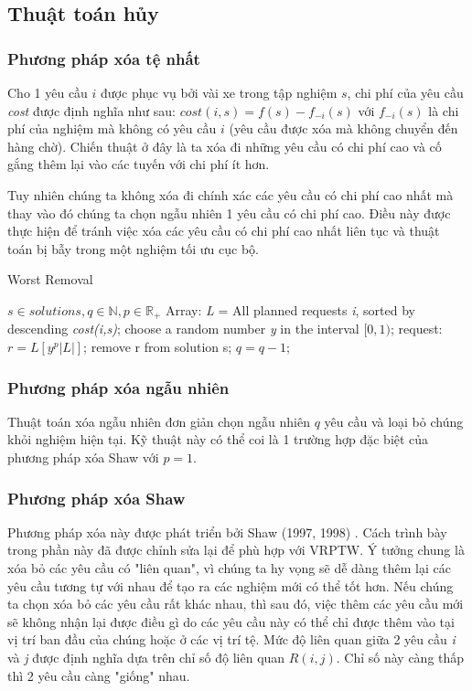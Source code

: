 \subsection{Thuật toán hủy}

\subsubsection*{Phương pháp xóa tệ nhất}
Cho 1 yêu cầu $i$ được phục vụ bởi vài xe trong tập nghiệm $s$, chi phí của yêu cầu \textit{cost} được định nghĩa như sau: $cost(i,s)=f(s)-f_{-i}(s)$ với $f_{-i}(s)$ là chi phí của nghiệm mà không có yêu cầu $i$ (yêu cầu được xóa mà không chuyển đến hàng chờ). Chiến thuật ở đây là ta xóa đi những yêu cầu có chi phí cao và cố gắng thêm lại vào các tuyến với chi phí ít hơn. 

Tuy nhiên chúng ta không xóa đi chính xác các yêu cầu có chi phí cao nhất mà thay vào đó chúng ta chọn ngẫu nhiên 1 yêu cầu có chi phí cao. Điều này được thực hiện để tránh việc xóa các yêu cầu có chi phí cao nhất liên tục và thuật toán bị bẫy trong một nghiệm tối ưu cục bộ.

\begin{algorithm}
  \label{alg:worst_removal}
    \caption{Worst Removal} 
	\begin{algorithmic}[1]
        \Require $s \in {solutions}, q \in \mathbb{N}, p \in \mathbb{R}_{+}$
		  \State Array: \textit{L} = All planned requests \textit{i}, sorted by descending \textit{cost(i,s)};
            \State choose a random number \textit{y} in the interval $[0, 1)$;
            \State request: $r = L\left[ y^p |L| \right]$;
            \State remove r from solution s;
            \State $q = q-1$;
        \EndWhile
	\end{algorithmic} 
\end{algorithm}

\subsubsection*{Phương pháp xóa ngẫu nhiên}
Thuật toán xóa ngẫu nhiên đơn giản chọn ngẫu nhiên $q$ yêu cầu và loại bỏ chúng khỏi nghiệm hiện tại. Kỹ thuật này có thể coi là 1 trường hợp đặc biệt của phương pháp xóa Shaw với $p=1$. 

\subsubsection*{Phương pháp xóa Shaw}
Phương pháp xóa này được phát triển bởi Shaw (1997, 1998) \cite{}. Cách trình bày trong phần này đã được chỉnh sửa lại để phù hợp với VRPTW. Ý tưởng chung là xóa bỏ các yêu cầu có "liên quan", vì chúng ta hy vọng sẽ dễ dàng thêm lại các yêu cầu tương tự với nhau để tạo ra các nghiệm mới có thể tốt hơn. Nếu chúng ta chọn xóa bỏ các yêu cầu rất khác nhau, thì sau đó, việc thêm các yêu cầu mới sẽ không nhận lại được điều gì do các yêu cầu này có thể chỉ được thêm vào tại vị trí ban đầu của chúng hoặc ở các vị trí tệ. Mức độ liên quan giữa 2 yêu cầu \textit{i} và \textit{j} được định nghĩa dựa trên chỉ số độ liên quan $R(i,j)$. Chỉ số này càng thấp thì 2 yêu cầu càng "giống" nhau.


